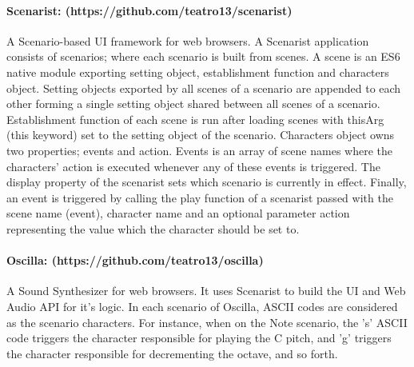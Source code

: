 \paragraph{Scenarist: (https://github.com/teatro13/scenarist)}
A Scenario-based UI framework for web browsers.
A Scenarist application consists of scenarios;
where each scenario is built from scenes.
A scene is an ES6 native module exporting setting object, establishment function and characters object.
Setting objects exported by all scenes of a scenario are appended to each other forming a single setting object
shared between all scenes of a scenario.
Establishment function of each scene is run after loading scenes
with thisArg (this keyword) set to the setting object of the scenario.
Characters object owns two properties; events and action.
Events is an array of scene names
where the characters' action is executed whenever any of these events is triggered.
The display property of the scenarist sets which scenario is currently in effect.
Finally, an event is triggered by calling the play function of a scenarist
passed with the scene name (event), character name and an optional parameter action
representing the value which the character should be set to.
\paragraph{Oscilla: (https://github.com/teatro13/oscilla)}
A Sound Synthesizer for web browsers.
It uses Scenarist to build the UI and Web Audio API for it's logic.
In each scenario of Oscilla,
ASCII codes are considered as the scenario characters.
For instance, when on the Note scenario,
the 's' ASCII code triggers the character responsible for playing the C pitch,
and 'g' triggers the character responsible for decrementing the octave, and so forth.
